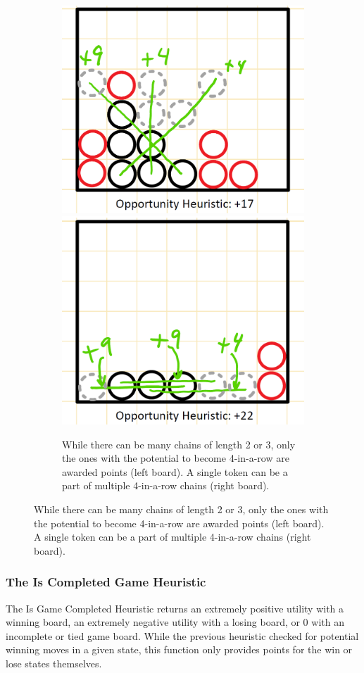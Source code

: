 \documentclass{article}
\begin{document}
\begin{figure}[htb]
    \centering
    \begin{subfigure}[b]{\textwidth}
        \centering
        \includegraphics[width=0.45\linewidth]{Writeup/opp-util-1.jpg}%
        \hfill
        \includegraphics[width=0.45\linewidth]{Writeup/opp-util-2.jpg}
        \captionsetup{labelformat=empty}
        \caption{While there can be many chains of length 2 or 3, only the ones with the potential to become 4-in-a-row are awarded points (left board). A single token can be a part of multiple 4-in-a-row chains (right board).}
    \end{subfigure}
\end{figure}

\subsubsection*{The Is Completed Game Heuristic}
The Is Game Completed Heuristic returns an extremely positive utility with a winning board, an extremely negative utility with a losing board, or 0 with an incomplete or tied game board. While the previous heuristic checked for potential winning moves in a given state, this function only provides points for the win or lose states themselves.
\end{document}
